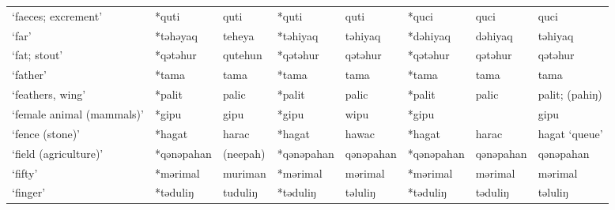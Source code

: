 \begin{landscape}
\begin{longtable}[c]{@{}p{3cm}<{\raggedright}p{2.75cm}<{\raggedright}p{2.75cm}<{\raggedright}p{2.75cm}<{\raggedright}p{2.75cm}<{\raggedright}p{2.75cm}<{\raggedright}p{2.75cm}<{\raggedright}p{2.75cm}<{\raggedright}@{}}
`faeces; excrement'                                  & *quti              & quti                           & *quti              & quti                       & *quci            & quci                     & quci                              \\
`far'                                                & *təhəyaq           & teheya                         & *təhiyaq           & təhiyaq                    & *dəhiyaq         & dəhiyaq                  & təhiyaq                           \\
`fat; stout'                                         & *qətəhur           & qutehun                        & *qətəhur           & qətəhur                    & *qətəhur         & qətəhur                  & qətəhur                           \\
`father'                                             & *tama              & tama                           & *tama              & tama                       & *tama            & tama                     & tama                              \\
`feathers, wing'                                     & *palit             & palic                          & *palit             & palic                      & *palit           & palic                    & palit; (pahiŋ)                    \\
`female animal (mammals)'                            & *gipu              & gipu                           & *gipu              & wipu                       & *gipu            &                          & gipu                              \\
`fence (stone)'                                      & *hagat             & harac                          & *hagat             & hawac                      & *hagat           & harac                    & hagat `queue'                     \\
`field (agriculture)'                                & *qənəpahan         & (neepah)                       & *qənəpahan         & qənəpahan                  & *qənəpahan       & qənəpahan                & qənəpahan                         \\
`fifty'                                              & *mərimal           & muriman                        & *mərimal           & mərimal                    & *mərimal         & mərimal                  & mərimal                           \\
`finger'                                             & *təduliŋ           & tuduliŋ                        & *təduliŋ           & təluliŋ                    & *təduliŋ         & təduliŋ                  & təluliŋ                           \\

\end{longtable}
\end{landscape}
